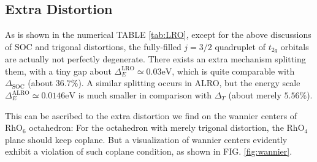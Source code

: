 \documentclass[10pt,nofootinbib,letterpaper]{revtex4}
\begin{document}
	\subsection{Extra Distortion}
		As is shown in the numerical TABLE \ref{tab:LRO}, except for the above discussions of SOC and trigonal distortions, the fully-filled $j=3/2$ quadruplet of $t_{2g}$ orbitals are actually not perfectly degenerate. There exists an extra mechanism splitting them, with a tiny gap about $\Delta_E^{\mathrm{LRO}}\simeq0.03\mathrm{eV}$, which is quite comparable with $\Delta_{\text{SOC}}$ (about $36.7\%$). A similar splitting occurs in ALRO, but the energy scale $\Delta_E^{\text{ALRO}}\simeq0.0146\mathrm{eV}$ is much smaller in comparison with $\Delta_T$ (about merely $5.56\%$).\par
		This can be ascribed to the extra distortion we find on the wannier centers of $\mathrm{RhO}_6$ octahedron: For the octahedron with merely trigonal distortion, the $\mathrm{RhO}_4$ plane should keep coplane. But a visualization of wannier centers evidently exhibit a violation of such coplane condition, as shown in FIG. \ref{fig:wannier}.\par
\end{document}
